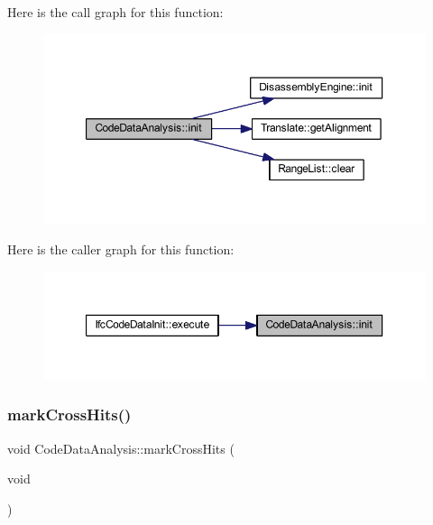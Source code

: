 Here is the call graph for this function\+:
\nopagebreak
\begin{figure}[H]
\begin{center}
\leavevmode
\includegraphics[width=350pt]{class_code_data_analysis_a0d201fd15ac961362b9dc8b51134bea3_cgraph}
\end{center}
\end{figure}
Here is the caller graph for this function\+:
\nopagebreak
\begin{figure}[H]
\begin{center}
\leavevmode
\includegraphics[width=350pt]{class_code_data_analysis_a0d201fd15ac961362b9dc8b51134bea3_icgraph}
\end{center}
\end{figure}
\mbox{\label{class_code_data_analysis_a1ac3f1a95c3c0ad7a59e15d1027f9909}} 
\subsubsection{\texorpdfstring{markCrossHits()}{markCrossHits()}}
{\footnotesize\ttfamily void Code\+Data\+Analysis\+::mark\+Cross\+Hits (\begin{DoxyParamCaption}\item[{void}]{ }\end{DoxyParamCaption})}




